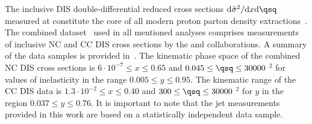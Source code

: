 The inclusive DIS double-differential reduced cross sections $\mathrm{d}\tilde\sigma^2/\mathrm{d}x\mathrm{d}\qsq$ measured at \hera constitute the core of all modern proton parton density extractions~\cite{Lai:2010vv,Martin:2009iq,Alekhin:2012ig,Ball:2011uy,Aaron:2009aa}. The combined dataset~\cite{Aaron:2009aa} used in all mentioned analyses comprises measurements of inclusive NC and CC DIS cross sections by the \hone and \zeus collaborations. A summary of the data samples is provided in~\cite{Aaron:2009aa}. The kinematic phase space of the combined NC DIS cross sections is $6\cdot 10^{-7} \le x \le 0.65$ and $0.045 \le \qsq \le 30000$ \GeV$^2$ for values of inelasticity in the range $0.005 \le y \le 0.95$. The kinematic range of the CC DIS data is $1.3\cdot 10^{-2} \le x \le 0.40$ and $300 \le \qsq \le 30000$ \GeV$^2$ for $y$ in the region $0.037 \le y \le 0.76$. It is important to note that the jet measurements provided in this work are based on a statistically independent data sample.

